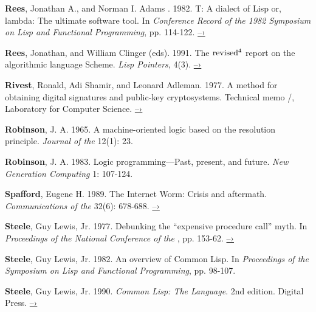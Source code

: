  \label{Rees and Adams 1982}
\textbf{Rees}, Jonathan A., and Norman I. Adams . 1982.  T: A dialect of Lisp or,
lambda: The ultimate software tool.  In \textit{Conference Record of the 1982
 Symposium on Lisp and Functional Programming}, pp.  114-122.
\href{http://people.csail.mit.edu/riastradh/t/adams82t.pdf}{–›}

\textbf{Rees}, Jonathan, and William Clinger (eds). 1991.  The \( \rm revised^4 \) report on the
algorithmic language Scheme.  \textit{Lisp Pointers}, 4(3).
\href{http://people.csail.mit.edu/jaffer/r4rs.pdf}{–›}

 \label{Rivest et al. (1977)}
\textbf{Rivest}, Ronald, Adi Shamir, and Leonard Adleman.  1977.  A method for obtaining
digital signatures and public-key cryptosystems. Technical memo /,
 Laboratory for Computer Science.
\href{http://people.csail.mit.edu/rivest/Rsapaper.pdf}{–›}

 \label{Robinson 1965}
\textbf{Robinson}, J. A. 1965.  A machine-oriented logic based on the resolution
principle.  \textit{Journal of the } 12(1): 23.

 \label{Robinson 1983}
\textbf{Robinson}, J. A. 1983.  Logic programming---Past, present, and future.
\textit{New Generation Computing} 1: 107-124.

 \label{Spafford 1989}
\textbf{Spafford}, Eugene H.  1989.  The Internet Worm: Crisis and aftermath.
\textit{Communications of the } 32(6): 678-688.
\href{http://citeseerx.ist.psu.edu/viewdoc/download?doi=10.1.1.123.8503&rep=rep1&type=pdf}{–›}

 \label{Steele 1977}
\textbf{Steele}, Guy Lewis, Jr.  1977.  Debunking the ``expensive procedure call'' myth.
In \textit{Proceedings of the National Conference of the },
pp. 153-62.
\href{http://dspace.mit.edu/handle/1721.1/5753}{–›}

\pagebreak

 \label{Steele 1982}
\textbf{Steele}, Guy Lewis, Jr.  1982.  An overview of Common Lisp.  In
\textit{Proceedings of the  Symposium on Lisp and Functional
Programming}, pp. 98-107.

 \label{Steele 1990}
\textbf{Steele}, Guy Lewis, Jr.  1990.  \textit{Common Lisp: The Language}. 2nd edition.
Digital Press.
\href{http://www.cs.cmu.edu/Groups/AI/html/cltl/cltl2.html}{–›}

